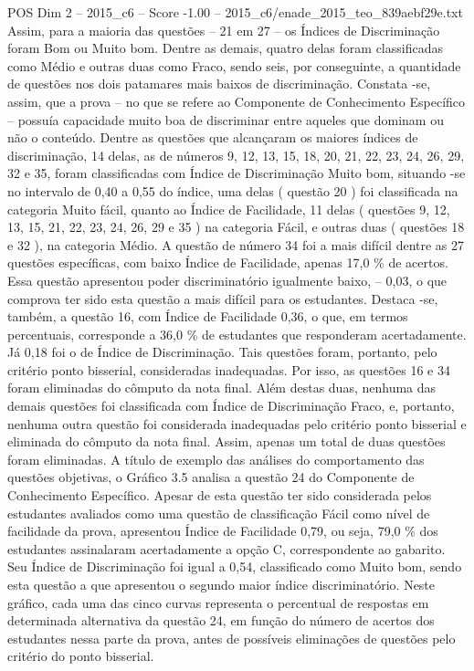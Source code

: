 \begin{textsample}{POS Dim 2 – 2015\_c6 – Score -1.00 – 2015\_c6/enade\_2015\_teo\_839aebf29e.txt}
Assim, para a maioria das questões – 21 em 27 – os Índices de Discriminação foram Bom ou Muito bom.
Dentre as demais, quatro delas foram classificadas como Médio e outras duas como Fraco, sendo seis, por conseguinte, a quantidade de questões nos dois patamares mais baixos de discriminação.
Constata -se, assim, que a prova – no que se refere ao Componente de Conhecimento Específico – possuía capacidade muito boa de discriminar entre aqueles que dominam ou não o conteúdo.
Dentre as questões que alcançaram os maiores índices de discriminação, 14 delas, as de números 9, 12, 13, 15, 18, 20, 21, 22, 23, 24, 26, 29, 32 e 35, foram classificadas com Índice de Discriminação Muito bom, situando -se no intervalo de 0,40 a 0,55 do índice, uma delas ( questão 20 ) foi classificada na categoria Muito fácil, quanto ao Índice de Facilidade, 11 delas ( questões 9, 12, 13, 15, 21, 22, 23, 24, 26, 29 e 35 ) na categoria Fácil, e outras duas ( questões 18 e 32 ), na categoria Médio.
A questão de número 34 foi a mais difícil dentre as 27 questões específicas, com baixo Índice de Facilidade, apenas 17,0 \% de acertos.
Essa questão apresentou poder discriminatório igualmente baixo, – 0,03, o que comprova ter sido esta questão a mais difícil para os estudantes.
Destaca -se, também, a questão 16, com Índice de Facilidade 0,36, o que, em termos percentuais, corresponde a 36,0 \% de estudantes que responderam acertadamente.
Já 0,18 foi o de Índice de Discriminação.
Tais questões foram, portanto, pelo critério ponto bisserial, consideradas inadequadas.
Por isso, as questões 16 e 34 foram eliminadas do cômputo da nota final.
Além destas duas, nenhuma das demais questões foi classificada com Índice de Discriminação Fraco, e, portanto, nenhuma outra questão foi considerada inadequadas pelo critério ponto bisserial e eliminada do cômputo da nota final.
Assim, apenas um total de duas questões foram eliminadas.
A título de exemplo das análises do comportamento das questões objetivas, o Gráfico 3.5 analisa a questão 24 do Componente de Conhecimento Específico.
Apesar de esta questão ter sido considerada pelos estudantes avaliados como uma questão de classificação Fácil como nível de facilidade da prova, apresentou Índice de Facilidade 0,79, ou seja, 79,0 \% dos estudantes assinalaram acertadamente a opção C, correspondente ao gabarito.
Seu Índice de Discriminação foi igual a 0,54, classificado como Muito bom, sendo esta questão a que apresentou o segundo maior índice discriminatório.
Neste gráfico, cada uma das cinco curvas representa o percentual de respostas em determinada alternativa da questão 24, em função do número de acertos dos estudantes nessa parte da prova, antes de possíveis eliminações de questões pelo critério do ponto bisserial.

\end{textsample}
